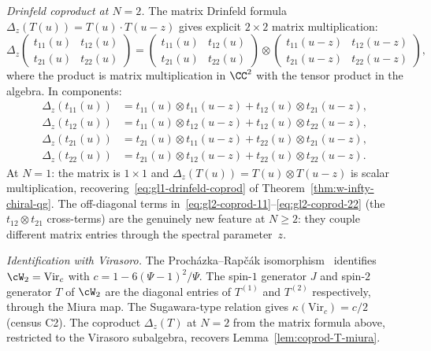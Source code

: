 \begin{example}[The $N = 2$ chiral quantum group:
$Y(\widehat{\mathfrak{gl}}_2)$ and Virasoro]
\medskip
\emph{Drinfeld coproduct at $N = 2$.}
The matrix Drinfeld formula
$\Delta_z(T(u)) = T(u) \cdot T(u - z)$
gives explicit $2 \times 2$ matrix multiplication:
\begin{equation}\label{eq:gl2-coprod-matrix}
 \Delta_z\!\begin{pmatrix}
 t_{11}(u) & t_{12}(u) \\
 t_{21}(u) & t_{22}(u)
 \end{pmatrix}
 =
 \begin{pmatrix}
 t_{11}(u) & t_{12}(u) \\
 t_{21}(u) & t_{22}(u)
 \end{pmatrix}
 \!\otimes\!
 \begin{pmatrix}
 t_{11}(u-z) & t_{12}(u-z) \\
 t_{21}(u-z) & t_{22}(u-z)
 \end{pmatrix}\!,
\end{equation}
where the product is matrix multiplication in $\CC^2$ with
the tensor product in the algebra. In components:
\begin{align}\label{eq:gl2-coprod-11}
 \Delta_z(t_{11}(u))
 &= t_{11}(u) \otimes t_{11}(u - z)
 + t_{12}(u) \otimes t_{21}(u - z), \\
 \label{eq:gl2-coprod-12}
 \Delta_z(t_{12}(u))
 &= t_{11}(u) \otimes t_{12}(u - z)
 + t_{12}(u) \otimes t_{22}(u - z), \\
 \label{eq:gl2-coprod-21}
 \Delta_z(t_{21}(u))
 &= t_{21}(u) \otimes t_{11}(u - z)
 + t_{22}(u) \otimes t_{21}(u - z), \\
 \label{eq:gl2-coprod-22}
 \Delta_z(t_{22}(u))
 &= t_{21}(u) \otimes t_{12}(u - z)
 + t_{22}(u) \otimes t_{22}(u - z).
\end{align}
At $N = 1$: the matrix is $1 \times 1$ and
$\Delta_z(T(u)) = T(u) \otimes T(u-z)$ is scalar
multiplication, recovering~\eqref{eq:gl1-drinfeld-coprod}
of Theorem~\ref{thm:w-infty-chiral-qg}. The off-diagonal
terms in~\eqref{eq:gl2-coprod-11}--\eqref{eq:gl2-coprod-22}
(the $t_{12} \otimes t_{21}$ cross-terms) are the
genuinely new feature at $N \geq 2$: they couple different
matrix entries through the spectral parameter~$z$.

\medskip
\emph{Identification with Virasoro.}
The Proch\'azka--Rap\v{c}\'ak isomorphism~\cite{PR19}
identifies $\cW_2 = \mathrm{Vir}_c$ with
$c = 1 - 6(\Psi - 1)^2/\Psi$. The spin-$1$ generator $J$
and spin-$2$ generator $T$ of $\cW_2$ are the diagonal
entries of $T^{(1)}$ and $T^{(2)}$ respectively, through
the Miura map. The Sugawara-type relation gives
$\kappa(\mathrm{Vir}_c) = c/2$ (census C2). The
coproduct $\Delta_z(T)$ at $N = 2$ from the matrix formula
above, restricted to the Virasoro subalgebra, recovers
Lemma~\ref{lem:coprod-T-miura}.
\end{example}

